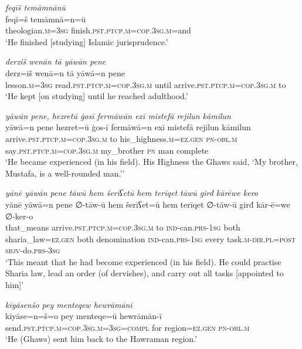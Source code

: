 \ea \label{ZP.16}
\textit{feqīš temāmnānū} \\ 
\gll feqī=š temāmnā=n=ū \\ 
 theologian\textsc{.m}\textsc{=3sg} finish\textsc{.pst}\textsc{.ptcp}\textsc{.m}\textsc{=cop}\textsc{.3sg}\textsc{.m}=and \\ 
\glt `He finished [studying] Islamic jurisprudence.'
\z 
 
\ea \label{ZP.17}
\textit{derziš wenān tā yāwān pene} \\ 
\gll derz=iš wenā=n tā yāwā=n pene \\ 
 lesson\textsc{.m}\textsc{=3sg} read\textsc{.pst}\textsc{.ptcp}\textsc{.m}\textsc{=cop}\textsc{.3sg}\textsc{.m} until arrive\textsc{.pst}\textsc{.ptcp}\textsc{.m}\textsc{=cop}\textsc{.3sg}\textsc{.m} to \\ 
\glt `He kept [on studying] until he reached adulthood.'
\z 
 
\ea \label{ZP.18}
\textit{yāwān pene, hezretū ġosī fermāwān exī mistefā rejilun kāmilun} \\ 
\gll yāwā=n pene hezret=ū ġos-ī fermāwā=n exī mistefā rejilun kāmilun \\ 
 arrive\textsc{.pst}\textsc{.ptcp}\textsc{.m}\textsc{=cop}\textsc{.3sg}\textsc{.m} to his\_highness\textsc{.m}\textsc{\textsc{=ez.gen}} \textsc{pn}\textsc{-obl}\textsc{.m} say\textsc{.pst}\textsc{.ptcp}\textsc{.m}\textsc{=cop}\textsc{.3sg}\textsc{.m} my\_brother \textsc{pn} man complete \\ 
\glt `He became experienced (in his field). His Highness the Ghaws said, ‘My brother, Mustafa, is a well-rounded man.’'
\z 
 
\ea \label{ZP.19}
\textit{yānē yāwān pene tāwū hem šerīʕetū hem terīqet tāwū girđ kārēwe kero} \\ 
\gll yānē yāwā=n pene ∅-tāw-ū hem šerīʕet=ū hem terīqet ∅-tāw-ū girđ kār-ē=we ∅-ker-o \\ 
 that\_means arrive\textsc{.pst}\textsc{.ptcp}\textsc{.m}\textsc{=cop}\textsc{.3sg}\textsc{.m} to \textsc{ind-}can\textsc{.prs}\textsc{-\textsc{1sg}} both sharia\_law\textsc{\textsc{=ez.gen}} both denomination \textsc{ind-}can\textsc{.prs}\textsc{-\textsc{1sg}} every task\textsc{.m}\textsc{-dir}\textsc{.pl}\textsc{=\textsc{post}} \textsc{sbjv-}do\textsc{.prs}\textsc{-3sg} \\ 
\glt `This meant that he had become experienced (in his field). He could practise Sharia law, lead an order (of dervishes), and carry out all tasks [appointed to him]'
\z 
 
\ea \label{ZP.20}
\textit{kīyāsenšo pey menteqew hewrāmānī} \\ 
\gll kīyāse=n=š=o pey menteqe=ū hewrāmān-ī \\ 
 send\textsc{.pst}\textsc{.ptcp}\textsc{.m}\textsc{=cop}\textsc{.3sg}\textsc{.m}\textsc{=3sg}\textsc{=compl} for region\textsc{\textsc{=ez.gen}} \textsc{pn}\textsc{-obl}\textsc{.m} \\ 
\glt `He (Ghaws) sent him back to the Hawraman region.'
\z 
 
